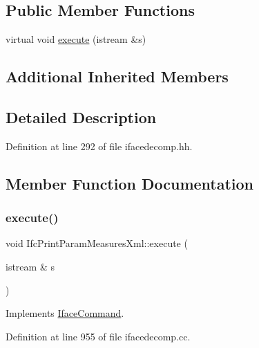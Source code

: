 \subsection*{Public Member Functions}
\begin{DoxyCompactItemize}
\item 
virtual void \mbox{\hyperlink{class_ifc_print_param_measures_xml_acb18a2d0a5b3aef6e417d2ab6ca48c5d}{execute}} (istream \&s)
\end{DoxyCompactItemize}
\subsection*{Additional Inherited Members}


\subsection{Detailed Description}


Definition at line 292 of file ifacedecomp.\+hh.



\subsection{Member Function Documentation}
\mbox{\label{class_ifc_print_param_measures_xml_acb18a2d0a5b3aef6e417d2ab6ca48c5d}} 
\subsubsection{\texorpdfstring{execute()}{execute()}}
{\footnotesize\ttfamily void Ifc\+Print\+Param\+Measures\+Xml\+::execute (\begin{DoxyParamCaption}\item[{istream \&}]{s }\end{DoxyParamCaption})\hspace{0.3cm}{\ttfamily [virtual]}}



Implements \mbox{\hyperlink{class_iface_command_af10e29cee2c8e419de6efe9e680ad201}{Iface\+Command}}.



Definition at line 955 of file ifacedecomp.\+cc.

